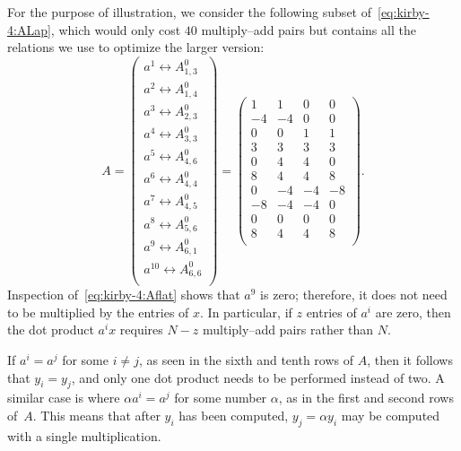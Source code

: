 For the purpose of illustration, we consider the following subset
of~\eqref{eq:kirby-4:ALap}, which would only cost $40$ multiply--add
pairs but contains all the relations we use to optimize the larger version:
\begin{equation} \label{eq:kirby-4:Aflat}
A =
\left(
\begin{array}{c}
  a^1 \leftrightarrow A^0_{1,3} \\
  a^2 \leftrightarrow A^0_{1,4} \\
  a^3 \leftrightarrow A^0_{2,3} \\
  a^4 \leftrightarrow A^0_{3,3} \\
  a^5 \leftrightarrow A^0_{4,6} \\
  a^6 \leftrightarrow A^0_{4,4} \\
  a^7 \leftrightarrow A^0_{4,5} \\
  a^8 \leftrightarrow A^0_{5,6} \\
  a^9 \leftrightarrow A^0_{6,1} \\
  a^{10} \leftrightarrow A^0_{6,6} \\
\end{array}
\right)
 =
\left(
\begin{array}{cccc}
1 & 1 & 0 & 0 \\
-4 & -4 & 0 & 0 \\
0 & 0 & 1 & 1 \\
3 & 3 & 3 & 3 \\
0 & 4 & 4 & 0 \\
8 & 4 & 4 & 8 \\
0 & -4 & -4 & -8 \\
-8 & -4 & -4 & 0 \\
 0 & 0 & 0 & 0 \\
8 & 4 & 4 & 8 \\
\end{array}
\right).
\end{equation}
%
Inspection of~\eqref{eq:kirby-4:Aflat} shows that $ a^9 $ is
zero; therefore, it does not need to be multiplied by the entries of $
x $. In particular, if $ z $ entries of $ a^i $ are zero, then the dot
product $ a^i x $ requires $ N - z $ multiply--add pairs rather than $
N $.

If $ a^i = a^j $ for some $ i \neq j $, as seen in the sixth and tenth
rows of $ A $, then it follows that $ y_i = y_j $, and only one dot
product needs to be performed instead of two. A similar case is where
$\alpha a^i = a^j $ for some number $ \alpha $, as in the first and
second rows of~$A$. This means that after $ y_i $ has been computed,
$y_j = \alpha y_i$ may be computed with a single multiplication.

